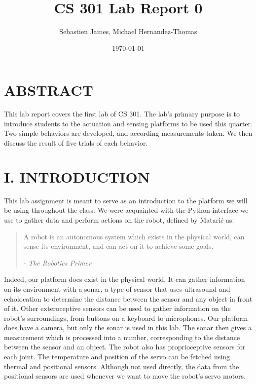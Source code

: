\documentclass[11pt]{article}
\begin{document}
\title{CS 301 Lab Report 0}
\author{Sebastien James, Michael Hernandez-Thomas}
\date{\today}
\maketitle

\section*{ABSTRACT}
This lab report covers the first lab of CS 301. The lab's primary purpose is to introduce students to the actuation and sensing platforms to be used this quarter. Two simple behaviors are developed, and according measurements taken. We then discuss the result of five trials of each behavior.

\section*{I. INTRODUCTION}

This lab assignment is meant to serve as an introduction to the platform we will be using throughout the class. We were acquainted with the Python interface we use to gather data and perform actions on the robot, defined by Matarić as:

\begin{quote}A robot is an autonomous system which exists in the physical world, can sense its environment, and can act on it to achieve some goals.\begin{flushright}- \textit{The Robotics Primer}\end{flushright}\end{quote}

Indeed, our platform does exist in the physical world. It can gather information on its environment with a sonar, a type of sensor that uses ultrasound and echolocation to determine the distance between the sensor and any object in front of it. Other exteroceptive sensors can be used to gather information on the robot's surroundings, from buttons on a keyboard to microphones. Our platform does have a camera, but only the sonar is used in this lab. The sonar then gives a measurement which is processed into a number, corresponding to the distance between the sensor and an object. The robot also has proprioceptive sensors for each joint. The temperature and position of the servo can be fetched using thermal and positional sensors. Although not used directly, the data from the positional sensors are used whenever we want to move the robot's servo motors.
\end{document}

